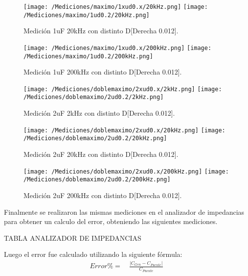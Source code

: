 \begin{figure}[H]
	\centering
	\texttt{[image: /Mediciones/maximo/1xud0.x/20kHz.png]}
	\texttt{[image: /Mediciones/maximo/1ud0.2/20kHz.png]}
\caption{Medición 1uF 20kHz con distinto D[Derecha 0.012].}
	\label{fig:fcon}
\end{figure}
\begin{figure}[H]
	\centering
	\texttt{[image: /Mediciones/maximo/1xud0.x/200kHz.png]}
	\texttt{[image: /Mediciones/maximo/1ud0.2/200kHz.png]}
\caption{Medición 1uF 200kHz con distinto D[Derecha 0.012].}
	\label{fig:fcon}
\end{figure}
\begin{figure}[H]
	\centering
	\texttt{[image: /Mediciones/doblemaximo/2xud0.x/2kHz.png]}
	\texttt{[image: /Mediciones/doblemaximo/2ud0.2/2kHz.png]}
\caption{Medición 2uF 2kHz con distinto D[Derecha 0.012].}
	\label{fig:fcon}
\end{figure}
\begin{figure}[H]
	\centering
	\texttt{[image: /Mediciones/doblemaximo/2xud0.x/20kHz.png]}
	\texttt{[image: /Mediciones/doblemaximo/2ud0.2/20kHz.png]}
\caption{Medición 2uF 20kHz con distinto D[Derecha 0.012].}
	\label{fig:fcon}
\end{figure}
\begin{figure}[H]
	\centering
	\texttt{[image: /Mediciones/doblemaximo/2xud0.x/200kHz.png]}
	\texttt{[image: /Mediciones/doblemaximo/2ud0.2/200kHz.png]}
\caption{Medición 2uF 200kHz con distinto D[Derecha 0.012].}
	\label{fig:fcon}
\end{figure}
Finalmente se realizaron las mismas mediciones en el analizador de impedancias para obtener un calculo del error, obteniendo las siguientes mediciones.\\
{\centering 
\begin{Huge}
\color{red} 
TABLA ANALIZADOR DE IMPEDANCIAS
\end{Huge}
}
Luego el error fue calculado utilizando la siguiente fórmula:
\begin{equation*}
\begin{split}
	 Error \% =& \ \frac{|C_{Gen}-C_{Puente}|}{C_{Puente}}\ 
\end{split}
\end{equation*}
